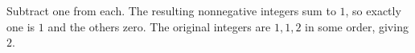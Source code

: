 Subtract one from each. The resulting nonnegative integers sum to $1$, so exactly one is $1$ and the others zero. The original integers are $1,1,2$ in some order, giving $\boxed2$.
